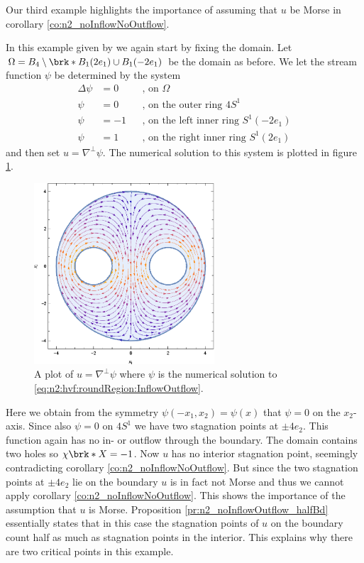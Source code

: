 Our third example highlights the importance of assuming that $u$ be Morse in corollary \ref{co:n2_noInflowNoOutflow}.
\begin{example}
  In this example given by \cite{Wahlen2023} we again start by fixing the domain.
  Let $\Omega=B_4\setminus\brk*{B_1(2e_1)\cup B_1(-2e_1)}$ be the domain as before.
  We let the stream function $\psi$ be determined by the system
  \begin{equation}
    \begin{aligned}
      \Delta \psi&=0 &&\text{, on }\Omega \\
      \psi&=0 &&\text{, on the outer ring }4S^1 \\
      \psi&=-1 &&\text{, on the left inner ring }S^1(-2e_1) \\
      \psi&=1 &&\text{, on the right inner ring }S^1(2e_1)
    \end{aligned}\label{eq:n2:hvf:roundRegion:InflowOutflow}
  \end{equation}
  and then set $u=\nabla^\perp\psi$.
  The numerical solution to this system is plotted in figure \ref{pl:n2_hvf_roundRegion_InflowOutflow}.
  \begin{figure}
    \centering
    \includegraphics[width=0.6\textwidth]{../Plots/HarmonicVectorFields_gr5.eps}
    \caption{A plot of $u=\nabla^\perp\psi$ where $\psi$ is the numerical solution to
    \eqref{eq:n2:hvf:roundRegion:InflowOutflow}.}
    \label{pl:n2_hvf_roundRegion_InflowOutflow}
  \end{figure}
  Here we obtain from the symmetry $\psi(-x_1,x_2)=\psi(x)$ that $\psi=0$ on
  the $x_2$-axis. Since also $\psi=0$ on $4S^1$ we have two stagnation points
  at $\pm4e_2$.
  This function again has no in- or outflow through the boundary. The domain contains
  two holes so $\chi\brk*{X}=-1$. Now $u$ has no interior stagnation point, seemingly contradicting
  corollary \ref{co:n2_noInflowNoOutflow}. But since the two stagnation points
  at $\pm4e_2$ lie on the boundary $u$ is in fact not Morse and thus we cannot apply corollary \ref{co:n2_noInflowNoOutflow}.
  This shows the importance of the assumption that $u$ is Morse.
  Proposition \ref{pr:n2_noInflowOutflow_halfBd}
  essentially states that in this case the stagnation points of $u$ on the boundary
  count half as much as stagnation points in the interior.
  This explains why there are two critical points in this example.
\end{example}

